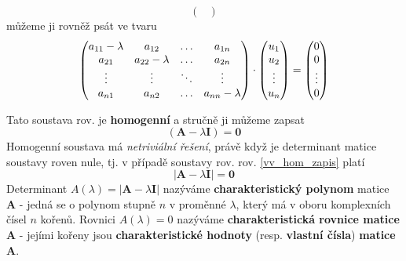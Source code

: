 \begin{definition}
\begin{equation}
\begin{pmatrix}
          \end{pmatrix}
        \end{equation}
        můžeme ji rovněž psát ve tvaru
        \begin{equation*}
            \begin{pmatrix}
            \setlength{\arraycolsep}{3pt}
              a_{11} -\lambda & a_{12}           & \ldots & a_{1n} \\
              a_{21}          & a_{22} -\lambda  & \ldots & a_{2n} \\
              \vdots          & \vdots           & \ddots & \vdots \\
              a_{n1}          & a_{n2}           & \ldots & a_{nn}-\lambda
            \end{pmatrix} \cdot
          \begin{pmatrix}
            u_{1} \\ u_{2} \\ \vdots \\ u_{n} \\
          \end{pmatrix}  =
          \begin{pmatrix}
              0 \\ 0 \\ \vdots \\ 0 \\
            \end{pmatrix}
        \end{equation*}
      \end{definition}

       Tato soustava rov. je \textbf{homogenní} a stručně ji můžeme zapsat
      \begin{equation}\label{vv_hom_zapis}
        \left(\mathbf{A} - \lambda\mathbf{I}\right) = \mathbf{0}
      \end{equation}
      Homogenní soustava má \emph{netriviální řešení}, právě když je determinant matice soustavy 
      roven  nule, tj. v případě soustavy rov. rov. \ref{vv_hom_zapis} platí
      \begin{equation}\label{vv_hom_reseni}
        |\mathbf{A} - \lambda\mathbf{I}| = \mathbf{0}
      \end{equation}
      Determinant \(A(\lambda)=|\mathbf{A} - \lambda \mathbf{I}|\) nazýváme 
      \textbf{charakteristický polynom} matice \(\mathbf{A}\) - jedná se o polynom stupně \(n\) v 
      proměnné \(\lambda\), který má v oboru komplexních čísel \(n\) kořenů. Rovnici 
      \(A(\lambda)=0\) nazýváme \textbf{charakteristická rovnice matice \(\mathbf{A}\)} - jejími 
      kořeny jsou \textbf{charakteristické hodnoty} (resp. \textbf{vlastní čísla}) 
      \textbf{matice} \(\mathbf{A}\).
            
